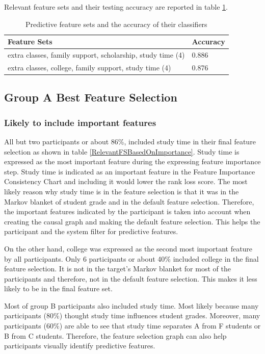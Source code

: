 Relevant feature sets and their testing accuracy are reported in table \ref{relevantFS}.

\begin{table}[]
\centering
\begin{tabular}{ll}
\hline
Feature Sets                                               & Accuracy \\ \hline
extra classes, family support, scholarship, study time (4) & 0.886    \\
extra classes, college, family support, study time (4)     & 0.876    \\ \hline

\end{tabular}
\caption{Predictive feature sets and the accuracy of their classifiers}
\label{relevantFS}
\end{table}

\subsection { Group A Best Feature Selection }

\subsubsection { Likely to include important features }
All but two participants or about 86\%, included study time in their final feature selection as shown in table \ref{RelevantFSBasedOnImportance}. Study time is expressed as the most important feature during the expressing feature importance step. Study time is indicated as an important feature in the Feature Importance Consistency Chart and including it would lower the rank loss score. The most likely reason why study time is in the feature selection is that it was in the Markov blanket of student grade and in the default feature selection. Therefore, the important features indicated by the participant is taken into account when creating the causal graph and making the default feature selection. This helps the participant and the system filter for predictive features.

On the other hand, college was expressed as the second most important feature by all participants. Only 6 participants or about 40\% included college in the final feature selection. It is not in the target's Markov blanket for most of the participants and therefore, not in the default feature selection. This makes it less likely to be in the final feature set.

Most of group B participants also included study time. Most likely because many participants (80\%) thought study time influences student grades. Moreover, many participants (60\%) are able to see that study time separates A from F students or B from C students. Therefore, the feature selection graph can also help participants visually identify predictive features.

